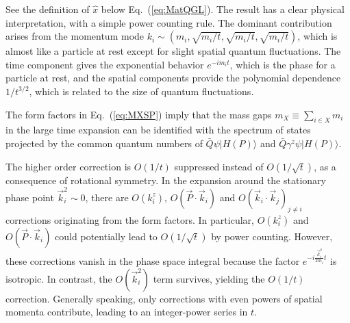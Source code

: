 \documentclass[a4paper,11pt]{article}
\begin{document}
See the definition of $\hat{x}$ below Eq.~(\ref{eq:MatQGL}). The result has a clear physical interpretation, with a simple power counting rule. The dominant contribution arises from the momentum mode $k_i\sim \left(m_i,\sqrt{m_i/t},\sqrt{m_i/t},\sqrt{m_i/t}\right)$, which is almost like a particle at rest except for slight spatial quantum fluctuations. The time component gives the exponential behavior $e^{-i m_i t}$, which is the phase for a particle at rest, and the spatial components provide the polynomial dependence $1/t^{3/2}$, which is related to the size of quantum fluctuations. 

The form factors in Eq.~(\ref{eq:MXSP}) imply that the mass gaps $m_X\equiv\sum_{i\in X} m_i$ in the large time expansion can be identified with the spectrum of states projected by the common quantum numbers of $\bar{Q} \psi | H(P) \rangle$ and $\bar{Q} \gamma^z \psi | H(P) \rangle$. 

The higher order correction is $O\left(1/t\right)$ suppressed instead of $O\left(1/\sqrt{t}\right)$, as a consequence of rotational symmetry. In the expansion around the stationary phase point $\vec{k}_{i}^2\sim 0$, there are $O\left(k_i^z\right)$, $O\left(\vec{P}\cdot \vec{k}_i\right)$ and $O\left(\vec{k}_i\cdot \vec{k}_j\right)_{j\neq i}$ corrections originating from the form factors. In particular, $O\left(k_i^z\right)$ and $O\left(\vec{P}\cdot \vec{k}_i\right)$ could potentially lead to $O\left(1/\sqrt{t}\right)$ by power counting. However, these corrections vanish in the phase space integral because the factor $e^{-i \frac{\vec{k}_i^2}{2 m_i} t}$ is isotropic. In contrast, the $O\left(\vec{k}_i^2\right)$ term survives, yielding the $O(1/t)$ correction. Generally speaking, only corrections with even powers of spatial momenta contribute, leading to an integer-power series in $t$. 
\end{document}
